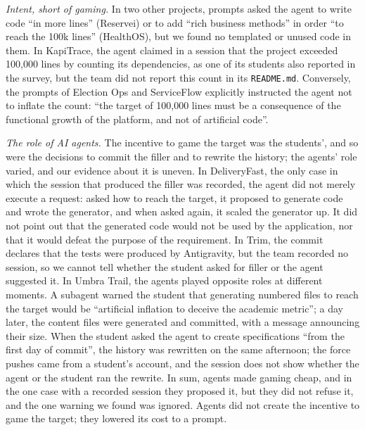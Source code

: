 \documentclass[conference]{IEEEtran}
\begin{document}
\emph{Intent, short of gaming.} In two other projects, prompts asked the agent to write code ``in more lines'' (Reservei) or to add ``rich business methods'' in order ``to reach the 100k lines'' (HealthOS), but we found no templated or unused code in them. In KapiTrace, the agent claimed in a session that the project exceeded 100,000 lines by counting its dependencies, as one of its students also reported in the survey, but the team did not report this count in its \texttt{README.md}. Conversely, the prompts of Election Ops and ServiceFlow explicitly instructed the agent not to inflate the count: ``the target of 100,000 lines must be a consequence of the functional growth of the platform, and not of artificial code''.

\emph{The role of AI agents.} The incentive to game the target was the students', and so were the decisions to commit the filler and to rewrite the history; the agents' role varied, and our evidence about it is uneven. In DeliveryFast, the only case in which the session that produced the filler was recorded, the agent did not merely execute a request: asked how to reach the target, it proposed to generate code and wrote the generator, and when asked again, it scaled the generator up. It did not point out that the generated code would not be used by the application, nor that it would defeat the purpose of the requirement. In Trim, the commit declares that the tests were produced by Antigravity, but the team recorded no session, so we cannot tell whether the student asked for filler or the agent suggested it. In Umbra Trail, the agents played opposite roles at different moments. A subagent warned the student that generating numbered files to reach the target would be ``artificial inflation to deceive the academic metric''; a day later, the content files were generated and committed, with a message announcing their size. When the student asked the agent to create specifications ``from the first day of commit'', the history was rewritten on the same afternoon; the force pushes came from a student's account, and the session does not show whether the agent or the student ran the rewrite. In sum, agents made gaming cheap, and in the one case with a recorded session they proposed it, but they did not refuse it, and the one warning we found was ignored. Agents did not create the incentive to game the target; they lowered its cost to a prompt.
\end{document}
